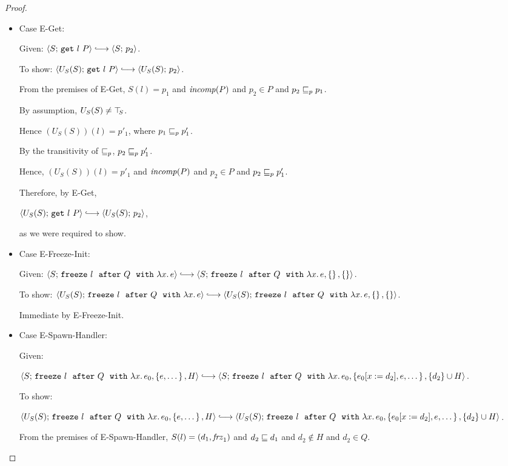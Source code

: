 \begin{proof}
\begin{itemize}
    \item Case {\sc E-Get}:

      Given: $\config{S}{\getexp{l}{P}} \parstepsto \config{S}{p_2}$.

      To show: $\config{U_S(S)}{\getexp{l}{P}} \parstepsto
      \config{U_S(S)}{p_2}$.

      From the premises of {\sc E-Get}, $S(l) = p_1$ and $\mathit{incomp}(P)$
      and $p_2 \in P$ and $p_2 \sqsubseteq_p p_1$.

      By assumption, $U_S(S) \neq \top\hspace{-0.85mm}_{S}$.

      Hence $(U_S(S))(l) = p'_1$, where $p_1 \sqsubseteq_p p'_1$.

      By the transitivity of $\sqsubseteq_p$, $p_2 \sqsubseteq_p p'_1$.

      Hence, $(U_S(S))(l) = p'_1$ and $\mathit{incomp}(P)$ and $p_2 \in P$ and
      $p_2 \sqsubseteq_p p'_1$.

      Therefore, by {\sc E-Get},

      $\config{U_S(S)}{\getexp{l}{P}} \parstepsto
      \config{U_S(S)}{p_2}$,

      as we were required to show.

    \item Case {\sc E-Freeze-Init}:

      Given: $\config{S}{\freezeafter{l}{Q}{\lam{x}{e}}} \parstepsto
      \config{S}{\freezeafterfull{l}{Q}{\lam{x}{e}}{\setof{}}{\setof{}}}$.

      To show: $\config{U_S(S)}{\freezeafter{l}{Q}{\lam{x}{e}}}
      \parstepsto
      \config{U_S(S)}{\freezeafterfull{l}{Q}{\lam{x}{e}}{\setof{}}{\setof{}}}$.

      Immediate by {\sc E-Freeze-Init}.

    \item Case {\sc E-Spawn-Handler}:

      Given:

      $\config{S}{\freezeafterfull{l}{Q}{\lam{x}{e_0}}{\setof{e,
            \dots}}{H}} \parstepsto
      \config{S}{\freezeafterfull{l}{Q}{\lam{x}{e_0}}{\setof{\subst{e_0}{x}{d_2},
            e, \dots}} {\{d_2\}\cup H}}$.

      To show:

      $\config{U_S(S)}{\freezeafterfull{l}{Q}{\lam{x}{e_0}}{\setof{e,
            \dots}}{H}} \parstepsto
      \config{U_S(S)}{\freezeafterfull{l}{Q}{\lam{x}{e_0}}{\setof{\subst{e_0}{x}{d_2},
            e, \dots}} {\{d_2\}\cup H}}$.

      From the premises of {\sc E-Spawn-Handler}, $S(l) =
      (d_1, \mathit{frz}_1)$ and $d_2 \sqsubseteq d_1$ and $d_2 \notin
      H$ and $d_2 \in Q$.


\end{itemize}
\end{proof}
